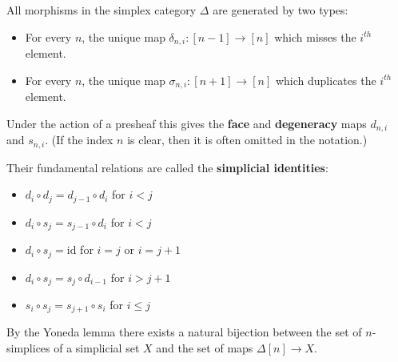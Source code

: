     \begin{property}
        All morphisms in the simplex category $\Delta$ are generated by two types:
        \begin{itemize}
            \item For every $n$, the unique map $\delta_{n, i}:[n-1]\rightarrow[n]$ which misses the $i^{th}$ element.
            \item For every $n$, the unique map $\sigma_{n, i}:[n+1]\rightarrow[n]$ which duplicates the $i^{th}$ element.
        \end{itemize}
        Under the action of a presheaf this gives the \textbf{face} and \textbf{degeneracy} maps $d_{n, i}$ and $s_{n, i}$. (If the index $n$ is clear, then it is often omitted in the notation.)

        Their fundamental relations are called the \textbf{simplicial identities}:
        \begin{itemize}
            \item $d_i\circ d_j = d_{j-1}\circ d_i$ for $i<j$
            \item $d_i\circ s_j = s_{j-1}\circ d_i$ for $i<j$
            \item $d_i\circ s_j = \text{id}$ for $i=j$ or $i=j+1$
            \item $d_i\circ s_j = s_j\circ d_{i-1}$ for $i>j+1$
            \item $s_i\circ s_j = s_{j+1}\circ s_i$ for $i\leq j$
        \end{itemize}
    \end{property}

    \begin{property}
        By the Yoneda lemma there exists a natural bijection between the set of $n$-simplices of a simplicial set $X$ and the set of maps $\Delta[n]\rightarrow X$.
    \end{property}

